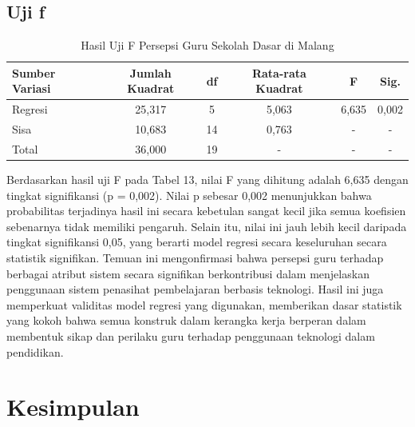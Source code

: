 \subsection{Uji f}

    \begin{table}[H]
        \centering
        \caption{Hasil Uji F Persepsi Guru Sekolah Dasar di Malang}
        \label{tab:uji-f}
        \begin{tabularx}{\textwidth}{lccccc}
            \toprule
            \textbf{Sumber Variasi} & \textbf{Jumlah Kuadrat} & \textbf{df} & \textbf{Rata-rata Kuadrat} & \textbf{F} & \textbf{Sig.} \\
            \midrule
            Regresi & 25,317 & 5 & 5,063 & 6,635 & 0,002 \\
            Sisa & 10,683 & 14 & 0,763 & - & - \\
            Total & 36,000 & 19 & - & - & - \\
            \bottomrule
        \end{tabularx}
    \end{table}

    Berdasarkan hasil uji F pada Tabel 13, nilai F yang dihitung adalah 6,635 dengan tingkat signifikansi (p = 0,002). Nilai p sebesar 0,002 menunjukkan bahwa probabilitas terjadinya hasil ini secara kebetulan sangat kecil jika semua koefisien sebenarnya tidak memiliki pengaruh. Selain itu, nilai ini jauh lebih kecil daripada tingkat signifikansi 0,05, yang berarti model regresi secara keseluruhan secara statistik signifikan. Temuan ini mengonfirmasi bahwa persepsi guru terhadap berbagai atribut sistem secara signifikan berkontribusi dalam menjelaskan penggunaan sistem penasihat pembelajaran berbasis teknologi. Hasil ini juga memperkuat validitas model regresi yang digunakan, memberikan dasar statistik yang kokoh bahwa semua konstruk dalam kerangka kerja berperan dalam membentuk sikap dan perilaku guru terhadap penggunaan teknologi dalam pendidikan.

\section{Kesimpulan}

